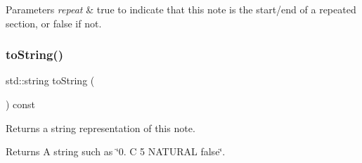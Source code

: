 \begin{DoxyParams}{Parameters}
{\em repeat} & true to indicate that this note is the start/end of a repeated section, or false if not. \\
\hline
\end{DoxyParams}
\mbox{\label{classNote_a1fe5121d6528fdea3f243321b3fa3a49}} 
\subsubsection{\texorpdfstring{to\+String()}{toString()}}
{\footnotesize\ttfamily std\+::string to\+String (\begin{DoxyParamCaption}{ }\end{DoxyParamCaption}) const}



Returns a string representation of this note. 

\begin{DoxyReturn}{Returns}
A string such as \char`\"{}0. C 5 N\+A\+T\+U\+R\+A\+L false\char`\"{}. 
\end{DoxyReturn}
